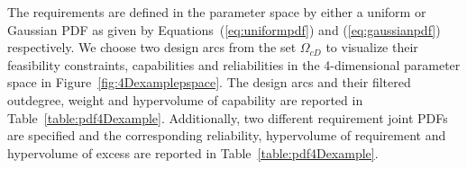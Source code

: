 The requirements are defined in the parameter space by either a uniform or Gaussian \ac{PDF} as given by Equations~(\ref{eq:uniformpdf}) and (\ref{eq:gaussianpdf}) respectively. We choose two design arcs from the set $\Omega_{cD}$ to visualize their feasibility constraints, capabilities and reliabilities in the 4-dimensional parameter space in Figure~\ref{fig:4Dexamplepspace}. The design arcs and their filtered outdegree, weight and hypervolume of capability are reported in Table~\ref{table:pdf4Dexample}. Additionally, two different requirement joint \acp{PDF} are specified and the corresponding reliability, hypervolume of requirement and hypervolume of excess are reported in Table~\ref{table:pdf4Dexample}.

\newcommand{\cwaa}{0.75cm} %
\newcommand{\cwa}{1.5cm} %
\newcommand{\cwc}{1.5cm} %
\newcommand{\cwd}{1cm} %
\newcommand{\cwe}{1.5cm} %
\newcommand{\cwf}{1.5cm} %
%
%
\newcommand{\cwb}{1.1cm} %
\newcommand{\cwi}{1.1cm} %
\newcommand{\cwj}{1.1cm} %

